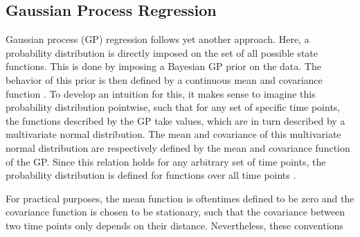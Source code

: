 
\subsection{Gaussian Process Regression}

Gaussian process (GP) regression follows yet another approach.
Here, a probability distribution is directly
imposed on the set of all possible state functions. This is done by imposing
a Bayesian GP prior on the data. The behavior of this
prior is then defined by a continuous mean and covariance function
\parencite{rasmussen_gaussian_2006, betancourt_robust_2020,
    roberts_gaussian_2013}. To develop an intuition for this, it makes sense to
imagine this probability distribution pointwise, such that for any set of
specific time points,
the functions described by the GP take values, which are in turn described by a
multivariate normal distribution.
The mean and covariance of this multivariate normal distribution are
respectively defined by the mean
and covariance function of the GP. Since this relation holds for any arbitrary
set of time points,
the probability distribution is defined for functions over all time points
\parencite{rasmussen_gaussian_2006,
    betancourt_robust_2020, roberts_gaussian_2013}.

For practical purposes, the mean function is oftentimes defined to be zero and
the
covariance function is chosen to be stationary, such that the covariance
between
two time points only depends on their distance. Nevertheless, these conventions

